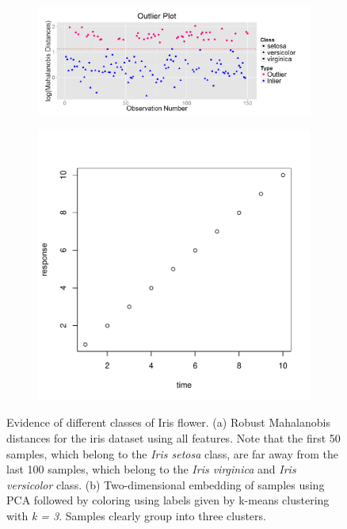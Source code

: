 \documentclass[12pt]{article}
\begin{document}
\begin{figure}[t]
	\centering
	\begin{subfigure}[b]{0.80\textwidth}
		\includegraphics[width=\textwidth]{Figures/Iris/OutliersIris.png}
		\subcaption{}
		\label{fig:IrisOutliers}
	\end{subfigure}	
	\begin{subfigure}[b]{0.80\textwidth}
		\includegraphics[width=\textwidth]{fig1.pdf}
		\subcaption{}
		\label{fig:IrisEmbedding}
	\end{subfigure}
	\caption{Evidence of different classes of Iris flower. (a) Robust Mahalanobis distances for the iris dataset using all features. Note that the first 50 samples, which belong to the \textit{Iris setosa} class, are far away from the last 100 samples, which belong to the \textit{Iris virginica} and \textit{Iris versicolor} class. (b) Two-dimensional embedding of samples using PCA followed by coloring using labels given by k-means clustering with \textit{k = 3}. Samples clearly group into three clusters.}
\end{figure}
\end{document}
